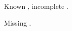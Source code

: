 \documentclass{article}
\begin{document}
Known \cite{knuth}, incomplete \cite{incomplete}.

Missing \cite{missingkey}.



\end{document}
